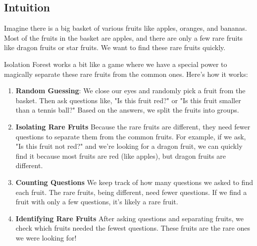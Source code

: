 \subsection{Intuition}




Imagine there is a big basket of various fruits like apples, oranges, and bananas. Most of the fruits in the basket are apples, and there are only a few rare fruits like dragon fruits or star fruits. We want to find these rare fruits quickly.

Isolation Forest works a bit like a game where we have a special power to magically separate these rare fruits from the common ones. Here's how it works:

\begin{enumerate}
  \item \textbf{Random Guessing}: We close our eyes and randomly pick a fruit from the basket. Then ask questions like, "Is this fruit red?" or "Is this fruit smaller than a tennis ball?" Based on the answers, we split the fruits into groups.
  \item \textbf{Isolating Rare Fruits} Because the rare fruits are different, they need fewer questions to separate them from the common fruits. For example, if we ask, "Is this fruit not red?" and we're looking for a dragon fruit, we can quickly find it because most fruits are red (like apples), but dragon fruits are different.
  \item \textbf{Counting Questions} We keep track of how many questions we asked to find each fruit. The rare fruits, being different, need fewer questions. If we find a fruit with only a few questions, it's likely a rare fruit.
  \item \textbf{Identifying Rare Fruits} After asking questions and separating fruits, we check which fruits needed the fewest questions. These fruits are the rare ones we were looking for!
\end{enumerate}

